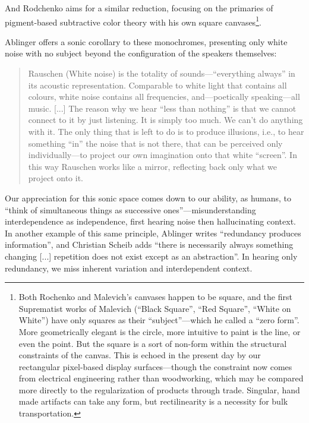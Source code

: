 \documentclass{thesis}
\begin{document}
And Rodchenko aims for a similar reduction, focusing on the primaries of pigment-based subtractive color theory with his own square canvases\footnote{Both Rochenko and Malevich's canvases happen to be square, and the first Suprematist works of Malevich (``Black Square'', ``Red Square'', ``White on White'') have only squares as their ``subject''---which he called a ``zero form''. More geometrically elegant is the circle, more intuitive to paint is the line, or even the point. But the square is a sort of non-form within the structural constraints of the canvas. This is echoed in the present day by our rectangular pixel-based display surfaces---though the constraint now comes from electrical engineering rather than woodworking, which may be compared more directly to the regularization of products through trade. Singular, hand made artifacts can take any form, but rectilinearity is a necessity for bulk transportation.}.

Ablinger offers a sonic corollary to these monochromes, presenting only white noise with no subject beyond the configuration of the speakers themselves:

	\begin{quote}
	Rauschen (White noise) is the totality of sounds---``everything always'' in its acoustic representation. Comparable to white light that contains all colours, white noise contains all frequencies, and---poetically speaking---all music. [...] The reason why we hear ``less than nothing'' is that we cannot connect to it by just listening. It is simply too much. We can't do anything with it. The only thing that is left to do is to produce illusions, i.e., to hear something ``in'' the noise that is not there, that can be perceived only individually---to project our own imagination onto that white ``screen''. In this way Rauschen works like a mirror, reflecting back only what we project onto it.\cite{peter_ablinger_rauschen_2006}
	\end{quote}
	
Our appreciation for this sonic space comes down to our ability, as humans, to ``think of simultaneous things as successive ones''\cite{christian_scheib_statics_????}---misunderstanding interdependence as independence, first hearing noise then hallucinating context. In another example of this same principle, Ablinger writes ``redundancy produces information'', and Christian Scheib adds ``there is necessarily always something changing [...] repetition does not exist except as an abstraction''. In hearing only redundancy, we miss inherent variation and interdependent context.
	
\end{document}
